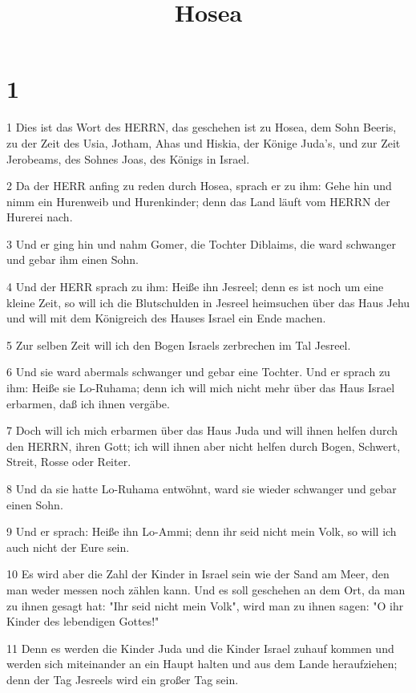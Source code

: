 

\title{Hosea}


\chapter{1}

\par 1 Dies ist das Wort des HERRN, das geschehen ist zu Hosea, dem Sohn Beeris, zu der Zeit des Usia, Jotham, Ahas und Hiskia, der Könige Juda's, und zur Zeit Jerobeams, des Sohnes Joas, des Königs in Israel.
\par 2 Da der HERR anfing zu reden durch Hosea, sprach er zu ihm: Gehe hin und nimm ein Hurenweib und Hurenkinder; denn das Land läuft vom HERRN der Hurerei nach.
\par 3 Und er ging hin und nahm Gomer, die Tochter Diblaims, die ward schwanger und gebar ihm einen Sohn.
\par 4 Und der HERR sprach zu ihm: Heiße ihn Jesreel; denn es ist noch um eine kleine Zeit, so will ich die Blutschulden in Jesreel heimsuchen über das Haus Jehu und will mit dem Königreich des Hauses Israel ein Ende machen.
\par 5 Zur selben Zeit will ich den Bogen Israels zerbrechen im Tal Jesreel.
\par 6 Und sie ward abermals schwanger und gebar eine Tochter. Und er sprach zu ihm: Heiße sie Lo-Ruhama; denn ich will mich nicht mehr über das Haus Israel erbarmen, daß ich ihnen vergäbe.
\par 7 Doch will ich mich erbarmen über das Haus Juda und will ihnen helfen durch den HERRN, ihren Gott; ich will ihnen aber nicht helfen durch Bogen, Schwert, Streit, Rosse oder Reiter.
\par 8 Und da sie hatte Lo-Ruhama entwöhnt, ward sie wieder schwanger und gebar einen Sohn.
\par 9 Und er sprach: Heiße ihn Lo-Ammi; denn ihr seid nicht mein Volk, so will ich auch nicht der Eure sein.
\par 10 Es wird aber die Zahl der Kinder in Israel sein wie der Sand am Meer, den man weder messen noch zählen kann. Und es soll geschehen an dem Ort, da man zu ihnen gesagt hat: "Ihr seid nicht mein Volk", wird man zu ihnen sagen: "O ihr Kinder des lebendigen Gottes!"
\par 11 Denn es werden die Kinder Juda und die Kinder Israel zuhauf kommen und werden sich miteinander an ein Haupt halten und aus dem Lande heraufziehen; denn der Tag Jesreels wird ein großer Tag sein.

